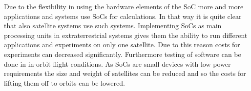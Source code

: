   Due to the flexibility in using the hardware elements of the SoC more and more applications and systems use SoCs for calculations. In that way it is quite clear that also satellite systems use such systems. Implementing SoCs as main processing units in extraterrestrial systems gives them the ability to run different applications and experiments on only one satellite. Due to this reason costs for experiments can decreased significantly. Furthermore testing of software can be done in in-orbit flight conditions. As SoCs are small devices with low power requirements the size and weight of satellites can be reduced and so the costs for lifting them off to orbits can be lowered.
 